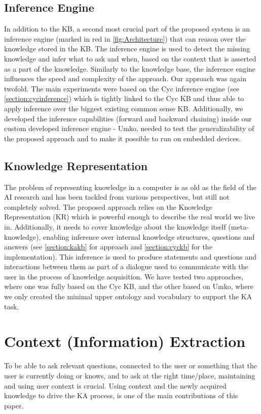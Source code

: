 \subsection{Inference Engine}
\label{section:bg:inference}
In addition to the KB, a second most crucial part of the proposed system is an 
inference engine (marked in red in \autoref{fig:Architecture}) that can reason 
over the knowledge stored in the KB. The inference engine is used to detect 
the missing knowledge and infer what to ask and when, based on the context 
that is asserted as a part of the knowledge. Similarly to the knowledge base, 
the inference engine influences the speed and complexity of the approach. Our 
approach was again twofold. The main experiments were based on the Cyc 
inference engine (see \autoref{section:cycinference}) which is tightly linked 
to the Cyc KB and thus able to apply inference over the biggest existing 
common sense KB. Additionally, we developed the inference capabilities 
(forward and backward chaining) inside our custom developed inference 
engine - Umko, needed to test the generalizability of the proposed approach 
and to make it possible to run on embedded devices.

\subsection{Knowledge Representation}
\label{section:bg:representation}
The problem of representing knowledge in a computer is as old as the field of 
the AI research and has been tackled from various perspectives, but still not 
completely solved. The proposed approach relies on the Knowledge Representation
(KR) which is powerful 
enough to describe the real world we live in. Additionally, it needs to cover 
knowledge about the knowledge itself (meta-knowledge), enabling inference over 
internal knowledge structures, questions and answers (see \autoref{section:kakb}
for approach and \autoref{section:cyckb} for the implementation). 
This inference is used to 
produce statements and questions and interactions between them as part of a 
dialogue used to communicate with the user in the process of knowledge 
acquisition. We have tested two approaches, where one was fully based on 
the Cyc KB, and the other based on Umko, where we only created the 
minimal upper ontology and vocabulary to support the KA task. 

\section{Context (Information) Extraction}
\label{section:bg:context}
To be able to ask relevant questions, connected to the user or something that 
the user is currently doing or knows, and to ask at the right time/place, 
maintaining and using user context is crucial. Using context and the newly 
acquired knowledge to drive the KA process, is one of the main contributions 
of this paper. 

